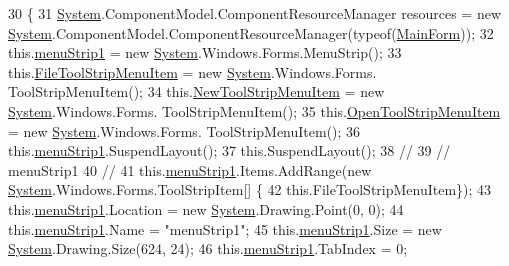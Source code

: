 \begin{DoxyCode}
30         \{
31             \hyperlink{namespace_system}{System}.ComponentModel.ComponentResourceManager resources = \textcolor{keyword}{new} 
      \hyperlink{namespace_system}{System}.ComponentModel.ComponentResourceManager(typeof(\hyperlink{class_desktop_network_analyzator_1_1_main_form_afe17fac50a2899e29e5a15940c2b2793}{MainForm}));
32             this.\hyperlink{class_desktop_network_analyzator_1_1_main_form_a7fa592a22158b187ebfb71236adcc7ac}{menuStrip1} = \textcolor{keyword}{new} \hyperlink{namespace_system}{System}.Windows.Forms.MenuStrip();
33             this.\hyperlink{class_desktop_network_analyzator_1_1_main_form_a605ff2f6848e2a4bed83d629b92c8de2}{FileToolStripMenuItem} = \textcolor{keyword}{new} \hyperlink{namespace_system}{System}.Windows.Forms.
      ToolStripMenuItem();
34             this.\hyperlink{class_desktop_network_analyzator_1_1_main_form_ae4b306685b46399668f12c7e1d8d6b23}{NewToolStripMenuItem} = \textcolor{keyword}{new} \hyperlink{namespace_system}{System}.Windows.Forms.
      ToolStripMenuItem();
35             this.\hyperlink{class_desktop_network_analyzator_1_1_main_form_a4a9b853312eea96ef6ff4711d47e7b2a}{OpenToolStripMenuItem} = \textcolor{keyword}{new} \hyperlink{namespace_system}{System}.Windows.Forms.
      ToolStripMenuItem();
36             this.\hyperlink{class_desktop_network_analyzator_1_1_main_form_a7fa592a22158b187ebfb71236adcc7ac}{menuStrip1}.SuspendLayout();
37             this.SuspendLayout();
38             \textcolor{comment}{// }
39             \textcolor{comment}{// menuStrip1}
40             \textcolor{comment}{// }
41             this.\hyperlink{class_desktop_network_analyzator_1_1_main_form_a7fa592a22158b187ebfb71236adcc7ac}{menuStrip1}.Items.AddRange(\textcolor{keyword}{new} \hyperlink{namespace_system}{System}.Windows.Forms.ToolStripItem[] \{
42             this.FileToolStripMenuItem\});
43             this.\hyperlink{class_desktop_network_analyzator_1_1_main_form_a7fa592a22158b187ebfb71236adcc7ac}{menuStrip1}.Location = \textcolor{keyword}{new} \hyperlink{namespace_system}{System}.Drawing.Point(0, 0);
44             this.\hyperlink{class_desktop_network_analyzator_1_1_main_form_a7fa592a22158b187ebfb71236adcc7ac}{menuStrip1}.Name = \textcolor{stringliteral}{"menuStrip1"};
45             this.\hyperlink{class_desktop_network_analyzator_1_1_main_form_a7fa592a22158b187ebfb71236adcc7ac}{menuStrip1}.Size = \textcolor{keyword}{new} \hyperlink{namespace_system}{System}.Drawing.Size(624, 24);
46             this.\hyperlink{class_desktop_network_analyzator_1_1_main_form_a7fa592a22158b187ebfb71236adcc7ac}{menuStrip1}.TabIndex = 0;

\end{DoxyCode}
